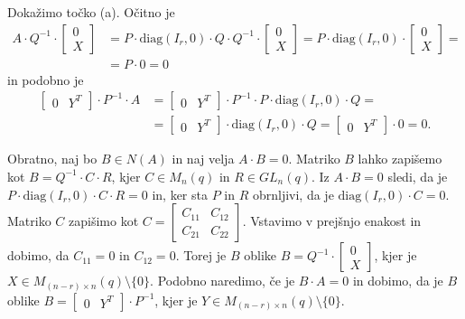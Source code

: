 \documentclass[mat1, tisk]{fmfdelo}
\begin{document}
\begin{dokaz}
  Dokažimo točko (a). Očitno je 
  \begin{align*}
    A \cdot Q^{-1} \cdot 
  \begin{bmatrix}
    0 \\
    X
  \end{bmatrix} &= P \cdot \text{diag}(I_r, 0) \cdot Q \cdot Q^{-1} \cdot 
  \begin{bmatrix}
    0 \\
    X
  \end{bmatrix} = P \cdot \text{diag}(I_r, 0) \cdot 
  \begin{bmatrix}
    0 \\
    X
  \end{bmatrix} = \\
  &= P \cdot 0 = 0
  \end{align*}
  in podobno je 
  \begin{align*}
    \begin{bmatrix}
      0 & Y^T
    \end{bmatrix} \cdot P^{-1} \cdot A &= 
    \begin{bmatrix}
      0 & Y^T
    \end{bmatrix} \cdot P^{-1} \cdot P \cdot \text{diag}(I_r, 0) \cdot Q = \\
    &=
    \begin{bmatrix}
      0 & Y^T
    \end{bmatrix} \cdot \text{diag}(I_r, 0) \cdot Q = 
    \begin{bmatrix}
      0 & Y^T
    \end{bmatrix} \cdot 0 = 0.
  \end{align*} 
  
  Obratno, naj bo $B \in N(A)$ in naj velja 
  $A \cdot B = 0$. Matriko $B$ lahko zapišemo kot $B = Q^{-1} \cdot C \cdot R$, 
  kjer $C \in M_n(q)$ in $R \in GL_n (q)$. Iz $A \cdot B = 0$ sledi, da je 
  $P \cdot \text{diag}(I_r, 0) \cdot C \cdot R = 0$ in, ker sta $P$ in $R$ obrnljivi, da 
  je $\text{diag}(I_r, 0) \cdot C = 0$. Matriko $C$ zapišimo kot 
  $C =  
  \begin{bmatrix}
    C_{11} & C_{12} \\
    C_{21} & C_{22}
  \end{bmatrix}$. Vstavimo v prejšnjo enakost in dobimo, da $C_{11} = 0$ in $C_{12} = 0$. 
  Torej je $B$ oblike $B = Q^{-1} \cdot 
  \begin{bmatrix}
    0 \\
    X
  \end{bmatrix}$, kjer je $X \in M_{(n-r) \times n}(q)\setminus\{0\}$. Podobno naredimo, 
  če je $B \cdot A = 0$ in dobimo, da je $B$ oblike $B = 
  \begin{bmatrix}
    0 & Y^T
  \end{bmatrix} \cdot P^{-1}$, kjer je $Y \in M_{(n-r) \times n}(q)\setminus\{0\}$.



\end{dokaz}
\end{document}
